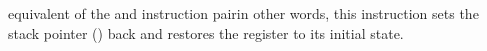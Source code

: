 \label{x86_ins:LEAVE}
\item[LEAVE]  
{equivalent of the  and  instruction 
pair\EMDASH{}in other words, this instruction sets the \gls{stack pointer} (\ESP) back and restores 
the \EBP register to its initial state.}

